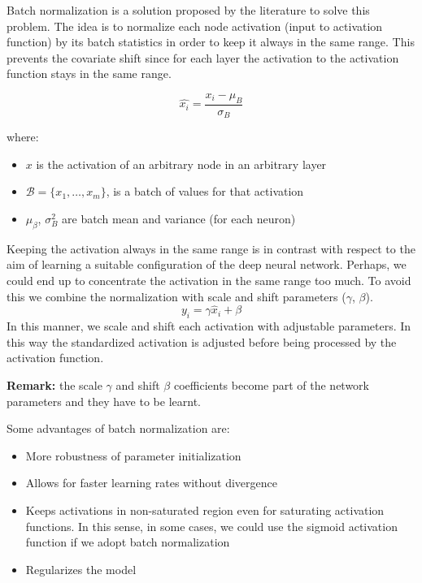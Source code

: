 Batch normalization is a solution proposed by the literature to solve this problem. The idea is to normalize each node activation (input to activation function) by its batch statistics in order to keep it always in the same range. This prevents the covariate shift since for each layer the activation to the activation function stays in the same range.

$$\hat{x_i} = \frac{x_i - \mu_B}{\sigma_B}$$

where:
\begin{itemize}
    \item $x$ is the activation of an arbitrary node in an arbitrary layer
    
    \item $\mathcal{B} = \{x_1, \hdots, x_m\}$, is a batch of values for that activation
    
    \item $\mu_\beta$, $\sigma_B^2$ are batch mean and variance (for each neuron)
\end{itemize}

Keeping the activation always in the same range is in contrast with respect to the aim of learning a suitable configuration of the deep neural network. Perhaps, we could end up to concentrate the activation in the same range too much. To avoid this we combine the normalization with scale and shift parameters ($\gamma$, $\beta$).
$$y_i = \gamma \hat{x}_i + \beta$$
In this manner, we scale and shift each activation with adjustable parameters. In this way the standardized activation is adjusted before being processed by the activation function. \newline

\textbf{Remark:} the scale $\gamma$ and shift $\beta$ coefficients become part of the network parameters and they have to be learnt. \newline

Some advantages of batch normalization are:
\begin{itemize}
    \item More robustness of parameter initialization
    
    \item Allows for faster learning rates without divergence
    
    \item Keeps activations in non-saturated region even for saturating activation functions. In this sense, in some cases, we could use the sigmoid activation function if we adopt batch normalization
    
    \item Regularizes the model
\end{itemize}

